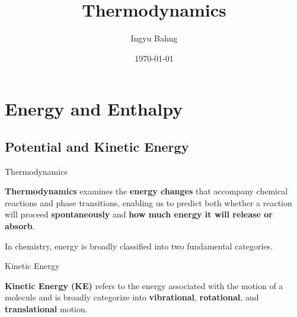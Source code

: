 \documentclass[10pt]{article}
\title{Thermodynamics}
\date{\today}
\author{Ingyu Bahng}
\begin{document}


\section{Energy and Enthalpy}

  \subsection{Potential and Kinetic Energy}

    \begin{core}{Thermodynamics}

      \textbf{Thermodynamics} examines the \textbf{energy changes} that accompany chemical reactions and phase transitions, enabling us to predict both whether a reaction will proceed \textbf{spontaneously} and \textbf{how much energy it will release or absorb}.

    \end{core}

    In chemistry, energy is broadly classified into two fundamental categories.

    \begin{core}{Kinetic Energy}

      \textbf{Kinetic Energy (KE)} refers to the energy associated with the motion of a molecule and is broadly categorize into \textbf{vibrational}, \textbf{rotational}, and \textbf{translational} motion.

    \end{core}
\end{document}
